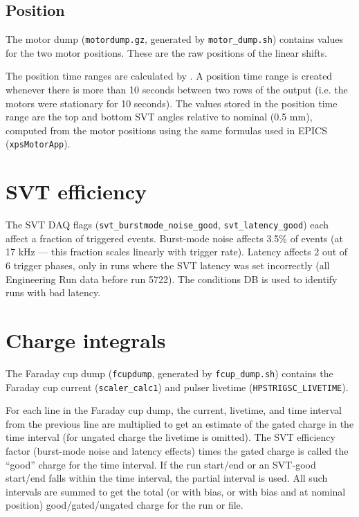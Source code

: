 \documentclass[aps,amsmath,amssymb,notitlepage,11pt,onecolumn]{revtex4-1}
\begin{document}
\subsection{Position}
The motor dump (\texttt{motordump.gz}, generated by \texttt{motor\_dump.sh}) contains values for the two motor positions.
These are the raw positions of the linear shifts.

The position time ranges are calculated by .
A position time range is created whenever there is more than 10 seconds between two rows of the output (i.e. the motors were stationary for 10 seconds).
The values stored in the position time range are the top and bottom SVT angles relative to nominal (0.5 mm), computed from the motor positions using the same formulas used in EPICS (\texttt{xpsMotorApp}).

\section{SVT efficiency}
The SVT DAQ flags (\texttt{svt\_burstmode\_noise\_good}, \texttt{svt\_latency\_good}) each affect a fraction of triggered events. Burst-mode noise affects 3.5\% of events (at 17 kHz --- this fraction scales linearly with trigger rate).
Latency affects 2 out of 6 trigger phases, only in runs where the SVT latency was set incorrectly (all Engineering Run data before run 5722). The conditions DB is used to identify runs with bad latency.

\section{Charge integrals}
The Faraday cup dump (\texttt{fcupdump}, generated by \texttt{fcup\_dump.sh}) contains the Faraday cup current (\texttt{scaler\_calc1}) and pulser livetime (\texttt{HPSTRIGSC\_LIVETIME}).

For each line in the Faraday cup dump, the current, livetime, and time interval from the previous line are multiplied to get an estimate of the gated charge in the time interval (for ungated charge the livetime is omitted).
The SVT efficiency factor (burst-mode noise and latency effects) times the gated charge is called the ``good'' charge for the time interval.
If the run start/end or an SVT-good start/end falls within the time interval, the partial interval is used.
All such intervals are summed to get the total (or with bias, or with bias and at nominal position) good/gated/ungated charge for the run or file.
\end{document}
